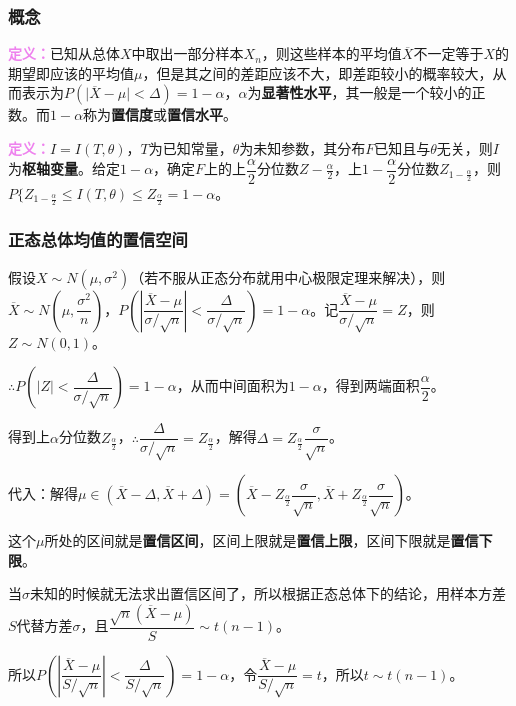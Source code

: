 \documentclass[UTF8, 12pt]{ctexart}
\begin{document}
\subsubsection{概念}

\textcolor{violet}{\textbf{定义：}}已知从总体$X$中取出一部分样本$X_n$，则这些样本的平均值$\overline{X}$不一定等于$X$的期望即应该的平均值$\mu$，但是其之间的差距应该不大，即差距较小的概率较大，从而表示为$P(\vert\overline{X}-\mu\vert<\Delta)=1-\alpha$，$\alpha$为\textbf{显著性水平}，其一般是一个较小的正数。而$1-\alpha$称为\textbf{置信度}或\textbf{置信水平}。

\textcolor{violet}{\textbf{定义：}}$I=I(T,\theta)$，$T$为已知常量，$\theta$为未知参数，其分布$F$已知且与$\theta$无关，则$I$为\textbf{枢轴变量}。给定$1-\alpha$，确定$F$上的上$\dfrac{\alpha}{2}$分位数$Z-{\frac{\alpha}{2}}$，上$1-\dfrac{\alpha}{2}$分位数$Z_{1-\frac{\alpha}{2}}$，则$P\{Z_{1-\frac{\alpha}{2}}\leqslant I(T,\theta)\leqslant Z_{\frac{\alpha}{2}}=1-\alpha$。

\subsubsection{正态总体均值的置信空间}

假设$X\sim N(\mu,\sigma^2)$（若不服从正态分布就用中心极限定理来解决），则$\overline{X}\sim N\left(\mu,\dfrac{\sigma^2}{n}\right)$，$P\left(\left\vert\dfrac{\overline{X}-\mu}{\sigma/\sqrt{n}}\right\vert<\dfrac{\Delta}{\sigma/\sqrt{n}}\right)=1-\alpha$。记$\dfrac{\overline{X}-\mu}{\sigma/\sqrt{n}}=Z$，则$Z\sim N(0,1)$。

$\therefore P\left(\vert Z\vert<\dfrac{\Delta}{\sigma/\sqrt{n}}\right)=1-\alpha$，从而中间面积为$1-\alpha$，得到两端面积$\dfrac{\alpha}{2}$。

得到上$\alpha$分位数$Z_\frac{\alpha}{2}$，$\therefore\dfrac{\Delta}{\sigma/\sqrt{n}}=Z_\frac{\alpha}{2}$，解得$\Delta=Z_\frac{\alpha}{2}\dfrac{\sigma}{\sqrt{n}}$。

代入：解得$\mu\in(\overline{X}-\Delta,\overline{X}+\Delta)=(\overline{X}-Z_\frac{\alpha}{2}\dfrac{\sigma}{\sqrt{n}},\overline{X}+Z_\frac{\alpha}{2}\dfrac{\sigma}{\sqrt{n}})$。

这个$\mu$所处的区间就是\textbf{置信区间}，区间上限就是\textbf{置信上限}，区间下限就是\textbf{置信下限}。

当$\sigma$未知的时候就无法求出置信区间了，所以根据正态总体下的结论，用样本方差$S$代替方差$\sigma$，且$\dfrac{\sqrt{n}(\overline{X}-\mu)}{S}\sim t(n-1)$。

所以$P\left(\left\vert\dfrac{\overline{X}-\mu}{S/\sqrt{n}}\right\vert<\dfrac{\Delta}{S/\sqrt{n}}\right)=1-\alpha$，令$\dfrac{\overline{X}-\mu}{S/\sqrt{n}}=t$，所以$t\sim t(n-1)$。
\end{document}
